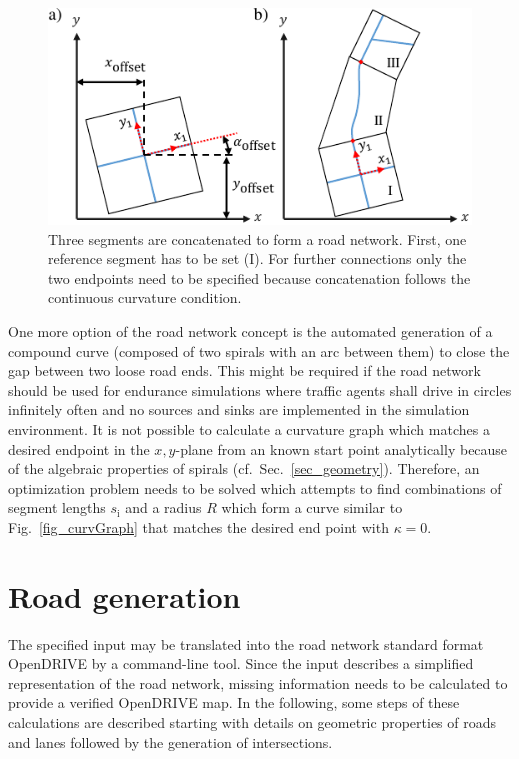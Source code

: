 \documentclass[a4paper, 10pt, conference]{ieeeconf}      %
\begin{document}
\begin{figure}[bt] 		
	\centering
	\includegraphics{fig/concatSegments.pdf}
	\caption{Three segments are concatenated to form a road network. First, one reference segment has to be set (I). For further connections only the two endpoints need to be specified because concatenation follows the continuous curvature condition.}
	\label{fig_concatSeg}
\end{figure}

One more option of the road network concept is the automated generation of a compound curve (composed of two spirals with an arc between them) to close the gap between two loose road ends. This might be required if the road network should be used for endurance simulations where traffic agents shall drive in circles infinitely often and no sources and sinks are implemented in the simulation environment. It is not possible to calculate a curvature graph which matches a desired endpoint in the $x,y$-plane from an known start point analytically because of the algebraic properties of spirals (cf.~Sec.~\ref{sec_geometry}). Therefore, an optimization problem needs to be solved which attempts to find combinations of segment lengths $s_\text{i}$ and a radius $R$ which form a curve similar to Fig.~\ref{fig_curvGraph} that matches the desired end point with $\kappa=0$.

\section{Road generation} \label{sec_roadGen}
The specified input may be translated into the road network standard format OpenDRIVE by a command-line tool. Since the input describes a simplified representation of the road network, missing information needs to be calculated to provide a verified OpenDRIVE map. In the following, some steps of these calculations are described starting with details on geometric properties of roads and lanes followed by the generation of intersections. 
\end{document}
